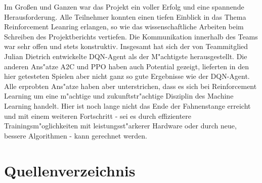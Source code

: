 \documentclass[12pt,a4paper]{article}
\begin{document}
Im Großen und Ganzen war das Projekt ein voller Erfolg und eine spannende Herausforderung. Alle Teilnehmer konnten einen tiefen Einblick in das Thema Reinforcement Leanring erlangen, so wie das wissenschaftliche Arbeiten beim Schreiben des Projektberichts vertiefen. Die Kommunikation innerhalb des Teams war sehr offen und stets konstruktiv.
Insgesamt hat sich der von Teammitglied Julian Dietrich entwickelte DQN-Agent als der M"achtigste herausgestellt. Die anderen Ans"atze A2C und PPO haben auch Potential gezeigt, lieferten in den hier getesteten Spielen aber nicht ganz so gute Ergebnisse wie der DQN-Agent.
Alle erprobten Ans"atze haben aber unterstrichen, dass es sich bei Reinforcement Learning um eine m"achtige und zukunftstr"achtige Disziplin des Machine Learning handelt. Hier ist noch lange nicht das Ende der Fahnenstange erreicht und mit einem weiteren Fortschritt - sei es durch effizientere Trainingsm"oglichkeiten mit leistungsst"arkerer Hardware oder durch neue, bessere Algorithmen - kann gerechnet werden.


\newpage

\section{Quellenverzeichnis}


\end{document}
